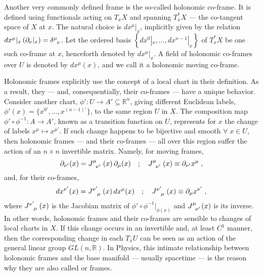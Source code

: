 \documentclass[../../main.tex]{subfiles}
\begin{document}
Another very commonly defined frame is the so-called holonomic co-frame. It is defined using functionals acting on $T_x X$ and spanning $T_x^{*} X$ --- the co-tangent space of $X$ at $x$. The natural choice is $dx^\mu|_x$, implicitly given by the relation $dx^\mu|_x \left(\partial_\nu|_x\right)=\tensor{\delta}{^\mu_\nu}$. Let the ordered basis $\left\{dx^0|_x,\ldots,dx^{n-1}|_x\right\}$ of $T^*_x X$ be one such co-frame at $x$, henceforth denoted by $dx^\mu|_x$. A field of holonomic co-frames over $U$ is denoted by $dx^\mu(x)$, and we call it a holonomic moving co-frame.

Holonomic frames explicitly use the concept of a local chart in their definition. As a result, they --- and, consequentially, their co-frames --- have a unique behavior. Consider another chart, $ \phi': U \rightarrow A' \subseteq \mathbb{R}^n $, giving different Euclidean labels, $ \phi'(x) = \{ x^{0'}, \ldots, x^{ \left( n-1 \right)' } \} $, to the same region $ U $ in $ X $. The composition map $ \phi' \circ \phi^{-1}: A \rightarrow A' $, known as a transition function on $U$, represents for $x$ the change of labels $ x^\mu \mapsto x^{ \mu' } $. If such change happens to be bijective and smooth $ \forall \; x \in U$, then holonomic frames --- and their co-frames --- all over this region suffer the action of an $ n \times n $ invertible matrix. Namely, for moving frames,
\begin{equation}
  \label{eq:holonomic-frame-transf-rule}
  \partial_{\nu'}(x) = \tensor{J}{^\mu_{\nu'}}\left(x\right) \partial_\mu(x) \quad ; \quad \tensor{J}{^\mu_{\nu'}}\left(x\right) \equiv \partial_{\nu'} x^\mu \;,
\end{equation}
and, for their co-frames,
\begin{equation}
  \label{eq:holonomic-coframe-transf-rule}
  dx^{\nu'}(x) = \tensor{J}{^{\nu'}_\mu}\left(x\right)dx^{\mu}(x) \quad ; \quad \tensor{J}{^{\nu'}_\mu}\left(x\right) \equiv \partial_\mu x^{\nu'} \;,
\end{equation}
where $\tensor{J}{^{\nu'}_\mu}\left(x\right)$ is the Jacobian matrix of $\phi'\circ {\phi}^{-1}|_{\phi(x)}$ and $\tensor{J}{^\mu_{\nu'}}(x)$ is its inverse. In other words, holonomic frames and their co-frames are sensible to changes of local charts in $X$. If this change occurs in an invertible and, at least $C^1$ manner, then the corresponding change in each $T_x U$ can be seen as an action of the general linear group $GL\left(n,\mathbb{R}\right)$. In Physics, this intimate relationship between holonomic frames and the base manifold --- usually spacetime --- is the reason why they are also called  or  frames.
\end{document}
